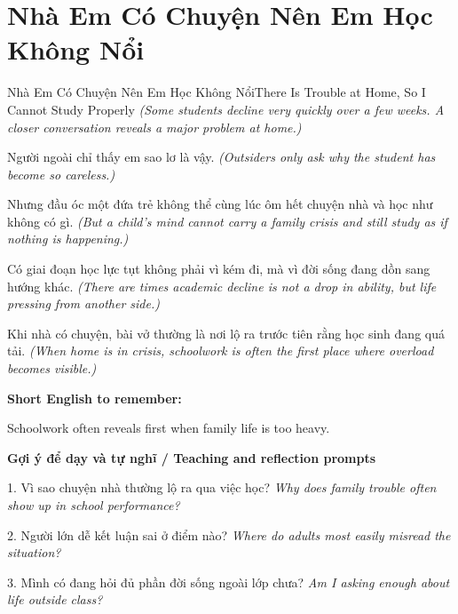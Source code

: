 \section{Nhà Em Có Chuyện Nên Em Học Không Nổi}
\begin{truyen}{Nhà Em Có Chuyện Nên Em Học Không Nổi}{There Is Trouble at Home, So I Cannot Study Properly}
\textit{(Some students decline very quickly over a few weeks. A closer conversation reveals a major problem at home.)}

Người ngoài chỉ thấy em sao lơ là vậy.
\textit{(Outsiders only ask why the student has become so careless.)}

Nhưng đầu óc một đứa trẻ không thể cùng lúc ôm hết chuyện nhà và học như không có gì.
\textit{(But a child's mind cannot carry a family crisis and still study as if nothing is happening.)}

Có giai đoạn học lực tụt không phải vì kém đi, mà vì đời sống đang dồn sang hướng khác.
\textit{(There are times academic decline is not a drop in ability, but life pressing from another side.)}

\end{truyen}

\begin{baihoc}
Khi nhà có chuyện, bài vở thường là nơi lộ ra trước tiên rằng học sinh đang quá tải.
\textit{(When home is in crisis, schoolwork is often the first place where overload becomes visible.)}
\end{baihoc}

\begin{ghinhoanh}
\textbf{Short English to remember:}

Schoolwork often reveals first when family life is too heavy.

\end{ghinhoanh}

\begin{tuhocnhanh}
\textbf{Gợi ý để dạy và tự nghĩ / Teaching and reflection prompts}

1. Vì sao chuyện nhà thường lộ ra qua việc học? \textit{Why does family trouble often show up in school performance?}

2. Người lớn dễ kết luận sai ở điểm nào? \textit{Where do adults most easily misread the situation?}

3. Mình có đang hỏi đủ phần đời sống ngoài lớp chưa? \textit{Am I asking enough about life outside class?}
\end{tuhocnhanh}
\ngancach

